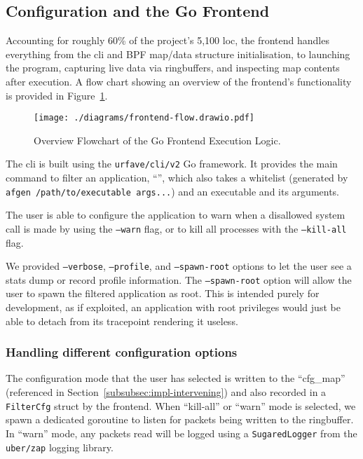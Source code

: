 \subsection{Configuration and the Go Frontend}\label{subsec:impl-frontend}

Accounting for roughly 60\% of the project's 5,100 \ac{loc}, the frontend handles 
everything from the \ac{cli} and BPF  map/data structure initialisation, to 
launching the program, capturing live data via ringbuffers, and inspecting 
map contents after execution. A flow chart showing an overview of the frontend's
functionality is provided in Figure~\ref{fig:frontend-flowchart}.

\begin{figure}[h]
\centering
\texttt{[image: ./diagrams/frontend-flow.drawio.pdf]}
\caption{Overview Flowchart of the Go Frontend Execution Logic.}
\label{fig:frontend-flowchart}
\end{figure}

The \ac{cli} is built using the \texttt{urfave/cli/v2} Go framework. It provides
the main command to filter an application, ``\af'', which also takes a whitelist
(generated by \texttt{afgen /path/to/executable args...}) and an
executable and its arguments. 

The user is able to configure the application to warn when a disallowed system call
is made by using the \texttt{--warn} flag, or to kill all processes with the
\texttt{--kill-all} flag. 

We provided \texttt{--verbose}, \texttt{--profile}, and \texttt{--spawn-root}
options to let the user see a stats dump or record profile information. The
\texttt{--spawn-root} option will allow the user to spawn the filtered
application as root. This is intended purely for development, as if exploited,
an application with root privileges would just be able to detach \af from its
tracepoint rendering it useless.


\subsubsection{Handling different configuration options}

The configuration mode that the user has selected is written to the
``cfg\_map'' (referenced in Section~\ref{subsubsec:impl-intervening}) and also
recorded in a \texttt{FilterCfg} struct by the frontend. When ``kill-all'' or
``warn'' mode is selected, we spawn a dedicated goroutine to listen for packets
being written to the ringbuffer. In ``warn'' mode, any packets read will be
logged using a \texttt{SugaredLogger} from the \texttt{uber/zap} logging
library. 

